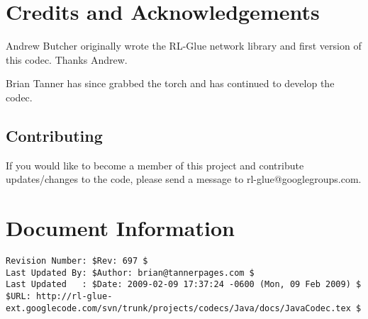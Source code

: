 \documentclass[11pt]{article}
\begin{document}
\section{Credits and Acknowledgements}
Andrew Butcher originally wrote the RL-Glue network library and first version of this codec.  Thanks Andrew.

Brian Tanner has since grabbed the torch and has continued to develop the codec.

\subsection{Contributing}
If you would like to become a member of this project and contribute updates/changes to the code, please send a message to rl-glue@googlegroups.com.


\section*{Document Information}
\begin{verbatim}
Revision Number: $Rev: 697 $
Last Updated By: $Author: brian@tannerpages.com $
Last Updated   : $Date: 2009-02-09 17:37:24 -0600 (Mon, 09 Feb 2009) $
$URL: http://rl-glue-ext.googlecode.com/svn/trunk/projects/codecs/Java/docs/JavaCodec.tex $
\end{verbatim}
\end{document}
